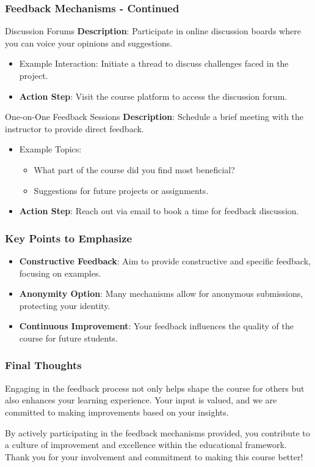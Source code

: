 \documentclass[aspectratio=169]{beamer}
\begin{document}
\begin{frame}[fragile]
  \frametitle{Feedback Mechanisms - Continued}
  \begin{block}{Discussion Forums}
    \textbf{Description}: Participate in online discussion boards where you can voice your opinions and suggestions.
    \begin{itemize}
      \item Example Interaction: Initiate a thread to discuss challenges faced in the project.
      \item \textbf{Action Step}: Visit the course platform to access the discussion forum.
    \end{itemize}
  \end{block}

  \begin{block}{One-on-One Feedback Sessions}
    \textbf{Description}: Schedule a brief meeting with the instructor to provide direct feedback.
    \begin{itemize}
      \item Example Topics:
      \begin{itemize}
        \item What part of the course did you find most beneficial?
        \item Suggestions for future projects or assignments.
      \end{itemize}
      \item \textbf{Action Step}: Reach out via email to book a time for feedback discussion.
    \end{itemize}
  \end{block}
\end{frame}

\begin{frame}[fragile]
  \frametitle{Key Points to Emphasize}
  \begin{itemize}
    \item \textbf{Constructive Feedback}: Aim to provide constructive and specific feedback, focusing on examples.
    \item \textbf{Anonymity Option}: Many mechanisms allow for anonymous submissions, protecting your identity.
    \item \textbf{Continuous Improvement}: Your feedback influences the quality of the course for future students.
  \end{itemize}
\end{frame}

\begin{frame}[fragile]
  \frametitle{Final Thoughts}
  Engaging in the feedback process not only helps shape the course for others but also enhances your learning experience. Your input is valued, and we are committed to making improvements based on your insights. 

  By actively participating in the feedback mechanisms provided, you contribute to a culture of improvement and excellence within the educational framework. Thank you for your involvement and commitment to making this course better!
\end{frame}
\end{document}
